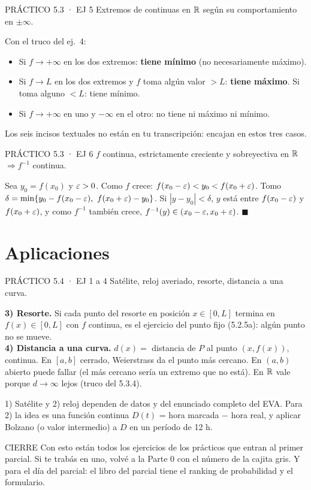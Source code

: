 \begin{enunciado}{PRÁCTICO 5.3 · EJ 5}
Extremos de continuas en $\mathbb{R}$ según su comportamiento en $\pm\infty$.
\end{enunciado}
Con el truco del ej.\ 4:
\begin{itemize}
\item Si $f\to+\infty$ en los dos extremos: \textbf{tiene mínimo} (no necesariamente máximo).
\item Si $f\to L$ en los dos extremos y $f$ toma algún valor $>L$: \textbf{tiene máximo}. Si toma alguno $<L$: tiene mínimo.
\item Si $f\to+\infty$ en uno y $-\infty$ en el otro: no tiene ni máximo ni mínimo.
\end{itemize}
\begin{falta}
Los seis incisos textuales no están en tu transcripción: encajan en estos tres casos.
\end{falta}

\begin{enunciado}{PRÁCTICO 5.3 · EJ 6}
$f$ continua, estrictamente creciente y sobreyectiva en $\mathbb{R}$ $\Rightarrow f^{-1}$ continua.
\end{enunciado}
Sea $y_0=f(x_0)$ y $\varepsilon>0$. Como $f$ crece: $f(x_0-\varepsilon)<y_0<f(x_0+\varepsilon)$. Tomo $\delta=\min\{y_0-f(x_0-\eps),\ f(x_0+\eps)-y_0\}$. Si $|y-y_0|<\delta$, $y$ está entre $f(x_0-\varepsilon)$ y $f(x_0+\varepsilon)$, y como $f^{-1}$ también crece, $f^{-1}(y)\in(x_0-\varepsilon,x_0+\varepsilon)$. $\blacksquare$

\section{Aplicaciones}

\begin{enunciado}{PRÁCTICO 5.4 · EJ 1 a 4}
Satélite, reloj averiado, resorte, distancia a una curva.
\end{enunciado}
\textbf{3) Resorte.} Si cada punto del resorte en posición $x\in[0,L]$ termina en $f(x)\in[0,L]$ con $f$ continua, es el ejercicio del punto fijo (5.2.5a): algún punto no se mueve.\\[2pt]
\textbf{4) Distancia a una curva.} $d(x)=$ distancia de $P$ al punto $(x,f(x))$, continua. En $[a,b]$ cerrado, Weierstrass da el punto más cercano. En $(a,b)$ abierto puede fallar (el más cercano sería un extremo que no está). En $\mathbb{R}$ vale porque $d\to\infty$ lejos (truco del 5.3.4).
\begin{falta}
1) Satélite y 2) reloj dependen de datos y del enunciado completo del EVA. Para 2) la idea es una función continua $D(t)$ = hora marcada − hora real, y aplicar Bolzano (o valor intermedio) a $D$ en un período de 12 h.
\end{falta}

\begin{sello}{CIERRE}
Con esto están todos los ejercicios de los prácticos que entran al primer parcial. Si te trabás en uno, volvé a la Parte 0 con el número de la cajita gris. Y para el día del parcial: el libro del parcial tiene el ranking de probabilidad y el formulario.
\end{sello}
